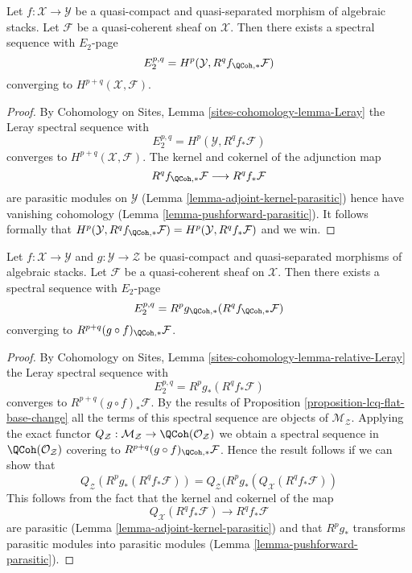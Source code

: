 \begin{lemma}
\label{lemma-leray}
Let $f : \mathcal{X} \to \mathcal{Y}$
be a quasi-compact and quasi-separated morphism of algebraic stacks.
Let $\mathcal{F}$ be a quasi-coherent sheaf on $\mathcal{X}$. Then
there exists a spectral sequence with $E_2$-page
$$
E_2^{p, q} = H^p(\mathcal{Y}, R^qf_{\QCoh, *}\mathcal{F})
$$
converging to $H^{p + q}(\mathcal{X}, \mathcal{F})$.
\end{lemma}

\begin{proof}
By Cohomology on Sites, Lemma \ref{sites-cohomology-lemma-Leray}
the Leray spectral sequence with
$$
E_2^{p, q} = H^p(\mathcal{Y}, R^qf_*\mathcal{F})
$$
converges to $H^{p + q}(\mathcal{X}, \mathcal{F})$. The kernel and cokernel
of the adjunction map
$$
R^qf_{\QCoh, *}\mathcal{F} \longrightarrow R^qf_*\mathcal{F}
$$
are parasitic modules on $\mathcal{Y}$
(Lemma \ref{lemma-adjoint-kernel-parasitic})
hence have vanishing cohomology
(Lemma \ref{lemma-pushforward-parasitic}).
It follows formally that
$H^p(\mathcal{Y}, R^qf_{\QCoh, *}\mathcal{F}) =
H^p(\mathcal{Y}, R^qf_*\mathcal{F})$ and we win.
\end{proof}

\begin{lemma}
\label{lemma-relative-leray}
Let $f : \mathcal{X} \to \mathcal{Y}$ and $g : \mathcal{Y} \to \mathcal{Z}$
be quasi-compact and quasi-separated morphisms of algebraic stacks.
Let $\mathcal{F}$ be a quasi-coherent sheaf on $\mathcal{X}$. Then
there exists a spectral sequence with $E_2$-page
$$
E_2^{p, q} = R^pg_{\QCoh, *}(R^qf_{\QCoh, *}\mathcal{F})
$$
converging to $R^{p + q}(g \circ f)_{\QCoh, *}\mathcal{F}$.
\end{lemma}

\begin{proof}
By Cohomology on Sites, Lemma \ref{sites-cohomology-lemma-relative-Leray}
the Leray spectral sequence with
$$
E_2^{p, q} = R^pg_*(R^qf_*\mathcal{F})
$$
converges to $R^{p + q}(g \circ f)_*\mathcal{F}$. By the results of
Proposition \ref{proposition-lcq-flat-base-change}
all the terms of this spectral sequence are objects of
$\mathcal{M}_\mathcal{Z}$. Applying the exact functor
$Q_\mathcal{Z} : \mathcal{M}_\mathcal{Z} \to
\QCoh(\mathcal{O}_\mathcal{Z})$ we obtain a spectral sequence in
$\QCoh(\mathcal{O}_\mathcal{Z})$ covering to
$R^{p + q}(g \circ f)_{\QCoh, *}\mathcal{F}$. Hence
the result follows if we can show that
$$
Q_\mathcal{Z}(R^pg_*(R^qf_*\mathcal{F})) =
Q_\mathcal{Z}(R^pg_*(Q_\mathcal{X}(R^qf_*\mathcal{F}))
$$
This follows from the fact that the kernel and cokernel of the map
$$
Q_\mathcal{X}(R^qf_*\mathcal{F}) \longrightarrow R^qf_*\mathcal{F}
$$
are parasitic (Lemma \ref{lemma-adjoint-kernel-parasitic}) and that
$R^pg_*$ transforms parasitic modules into parasitic modules
(Lemma \ref{lemma-pushforward-parasitic}).
\end{proof}

